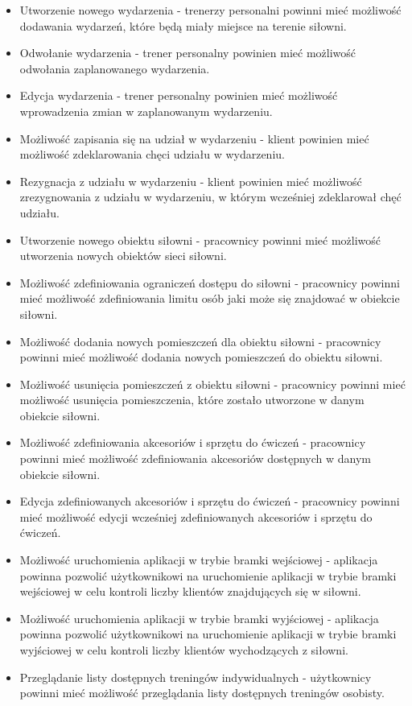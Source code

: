 \documentclass[a4paper,twoside,12pt]{book}
\begin{document}
{\begin{itemize}
			\item Utworzenie nowego wydarzenia - trenerzy personalni powinni mieć możliwość dodawania wydarzeń, które będą miały miejsce na terenie siłowni.
			\item Odwołanie wydarzenia - trener personalny powinien mieć możliwość odwołania zaplanowanego wydarzenia.
			\item Edycja wydarzenia - trener personalny powinien mieć możliwość wprowadzenia zmian w zaplanowanym wydarzeniu.
			\item Możliwość zapisania się na udział w wydarzeniu - klient powinien mieć możliwość zdeklarowania chęci udziału w wydarzeniu.
			\item Rezygnacja z udziału w wydarzeniu - klient powinien mieć możliwość zrezygnowania z udziału w wydarzeniu, w którym wcześniej zdeklarował chęć udziału.
			\item Utworzenie nowego obiektu siłowni - pracownicy powinni mieć możliwość utworzenia nowych obiektów sieci siłowni.
			\item Możliwość zdefiniowania ograniczeń dostępu do siłowni - pracownicy powinni mieć możliwość zdefiniowania limitu osób jaki może się znajdować w obiekcie siłowni.
			\item Możliwość dodania nowych pomieszczeń dla obiektu siłowni - pracownicy powinni mieć możliwość dodania nowych pomieszczeń do obiektu siłowni.
			\item Możliwość usunięcia pomieszczeń z obiektu siłowni - pracownicy powinni mieć możliwość usunięcia pomieszczenia, które zostało utworzone w danym obiekcie siłowni.
			\item Możliwość zdefiniowania akcesoriów i sprzętu do ćwiczeń - pracownicy powinni mieć możliwość zdefiniowania akcesoriów dostępnych w danym obiekcie siłowni.
			\item Edycja zdefiniowanych akcesoriów i sprzętu do ćwiczeń - pracownicy powinni mieć możliwość edycji wcześniej zdefiniowanych akcesoriów i sprzętu do ćwiczeń.
			\item Możliwość uruchomienia aplikacji w trybie bramki wejściowej - aplikacja powinna pozwolić użytkownikowi na uruchomienie aplikacji w trybie bramki wejściowej w celu kontroli liczby klientów znajdujących się w siłowni.
			\item Możliwość uruchomienia aplikacji w trybie bramki wyjściowej - aplikacja powinna pozwolić użytkownikowi na uruchomienie aplikacji w trybie bramki wyjściowej w celu kontroli liczby klientów wychodzących z siłowni.
			\item Przeglądanie listy dostępnych treningów indywidualnych - użytkownicy powinni mieć możliwość przeglądania listy dostępnych treningów osobisty.

\end{itemize}}
\end{document}

